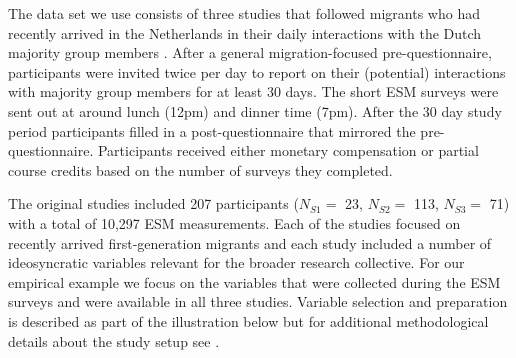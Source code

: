 The data set we use consists of three studies that followed migrants who
had recently arrived in the Netherlands in their daily interactions with
the Dutch majority group members \citep[for the data set see][]{Kreienkamp2022b}. After a
general migration-focused pre-questionnaire, participants were invited
twice per day to report on their (potential) interactions with majority
group members for at least 30 days. The short ESM surveys were sent out
at around lunch (12pm) and dinner time (7pm). After the 30 day study
period participants filled in a post-questionnaire that mirrored the
pre-questionnaire. Participants received either monetary compensation or
partial course credits based on the number of surveys they completed.

The original studies included 207 participants (\(N_{S1}=\) 23,
\(N_{S2}=\) 113, \(N_{S3}=\) 71) with a total of 10,297 ESM
measurements. Each of the studies focused on recently arrived
first-generation migrants and each study included a number of
ideosyncratic variables relevant for the broader research collective.
For our empirical example we focus on the variables that were collected
during the ESM surveys and were available in all three studies. Variable
selection and preparation is described as part of the illustration below
but for additional methodological details about the study setup see \citet[][]{Kreienkamp2022b}.
